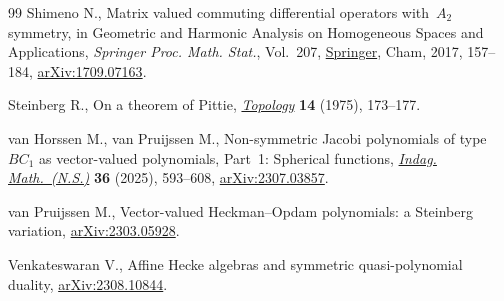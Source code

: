 \documentclass[10pt,a4paper]{amsart}
\theoremstyle{definition}
\numberwithin{equation}{section}
\begin{document}
\begin{thebibliography}{99}
Shimeno N., Matrix valued commuting differential operators with~{$A_2$}
 symmetry, in Geometric and {H}armonic {A}nalysis on {H}omogeneous {S}paces
 and {A}pplications, \textit{Springer Proc. Math. Stat.}, Vol.~207,
 \href{https://doi.org/10.1007/978-3-319-65181-1_6}{Springer}, Cham, 2017,
 157--184, \href{http://arxiv.org/abs/1709.07163}{arXiv:1709.07163}.

Steinberg R., On a theorem of {P}ittie,
 \href{https://doi.org/10.1016/0040-9383(75)90025-7}{\textit{Topology}}
 \textbf{14} (1975), 173--177.

van Horssen M., van Pruijssen M., Non-symmetric {J}acobi polynomials of
 type~{$B C_1$} as vector-valued polynomials, {P}art~1: {S}pherical functions,
 \href{https://doi.org/10.1016/j.indag.2024.09.003}{\textit{Indag.
 Math.~(N.S.)}} \textbf{36} (2025), 593--608,
 \href{http://arxiv.org/abs/2307.03857}{arXiv:2307.03857}.

van Pruijssen M., Vector-valued {H}eckman--{O}pdam polynomials: a {S}teinberg
 variation, \href{http://arxiv.org/abs/2303.05928}{arXiv:2303.05928}.

Venkateswaran V., Affine Hecke algebras and symmetric quasi-polynomial duality,
 \href{http://arxiv.org/abs/2308.10844}{arXiv:2308.10844}.

\end{thebibliography}
\end{document}
